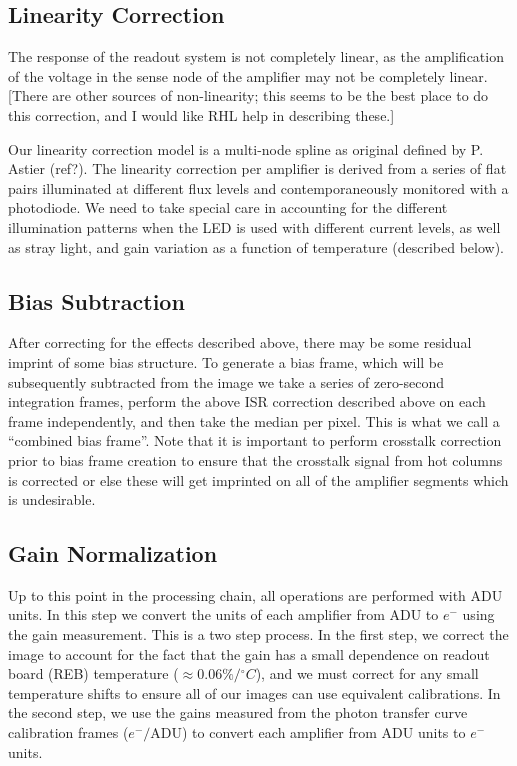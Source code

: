 \documentclass[SE,authoryear,lsstdraft,toc]{lsstdoc}
\newcommand{\etron}{e^{-}}
\begin{document}
\subsection{Linearity Correction}

The response of the readout system is not completely linear, as the
amplification of the voltage in the sense node of the amplifier may not be
completely linear.  [There are other sources of non-linearity; this seems to be
the best place to do this correction, and I would like RHL help in describing
these.]

Our linearity correction model is a multi-node spline as original defined by
P. Astier (ref?).  The linearity correction per amplifier is derived from a
series of flat pairs illuminated at different flux levels and contemporaneously
monitored with a photodiode.  We need to take special care in accounting for
the different illumination patterns when the LED is used with different current
levels, as well as stray light, and gain variation as a function of temperature
(described below).

\subsection{Bias Subtraction}

After correcting for the effects described above, there may be some residual
imprint of some bias structure.  To generate a bias frame, which will be
subsequently subtracted from the image we take a series of zero-second
integration frames, perform the above ISR correction described above on each
frame independently, and then take the median per pixel.  This is what we call
a ``combined bias frame''. Note that it is important to perform crosstalk
correction prior to bias frame creation to ensure that the crosstalk signal
from hot columns is corrected or else these will get imprinted on all of the
amplifier segments which is undesirable.

\subsection{Gain Normalization}

Up to this point in the processing chain, all operations are performed with ADU
units. In this step we convert the units of each amplifier from ADU to $\etron$ using
the gain measurement.  This is a two step process.  In the first step, we
correct the image to account for the fact that the gain has a small dependence
on readout board (REB) temperature ($\approx 0.06\%/{^\circ}C$), and we must
correct for any small temperature shifts to ensure all of our images can use
equivalent calibrations.  In the second step, we use the gains measured from
the photon transfer curve calibration frames ($\etron / \mathrm{ADU}$) to
convert each amplifier from ADU units to $\etron$ units.
\end{document}
